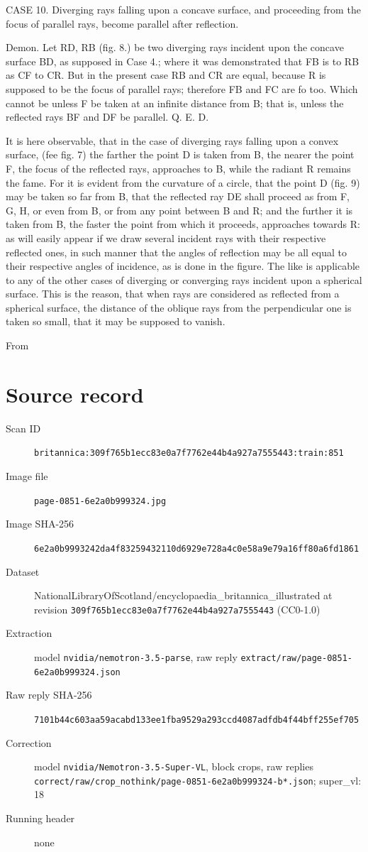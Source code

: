 \documentclass{article}
\begin{document}
CASE 10. Diverging rays falling upon a concave surface, and proceeding from the focus of parallel rays, become parallel after reflection.

Demon. Let RD, RB (fig. 8.) be two diverging rays incident upon the concave surface BD, as supposed in Case 4.; where it was demonstrated that FB is to RB as CF to CR. But in the present case RB and CR are equal, because R is supposed to be the focus of parallel rays; therefore FB and FC are fo too. Which cannot be unless F be taken at an infinite distance from B; that is, unless the reflected rays BF and DF be parallel. Q. E. D.

It is here observable, that in the case of diverging rays falling upon a convex surface, (fee fig. 7) the farther the point D is taken from B, the nearer the point F, the focus of the reflected rays, approaches to B, while the radiant R remains the fame. For it is evident from the curvature of a circle, that the point D (fig. 9) may be taken so far from B, that the reflected ray DE shall proceed as from F, G, H, or even from B, or from any point between B and R; and the further it is taken from B, the faster the point from which it proceeds, approaches towards R: as will easily appear if we draw several incident rays with their respective reflected ones, in such manner that the angles of reflection may be all equal to their respective angles of incidence, as is done in the figure. The like is applicable to any of the other cases of diverging or converging rays incident upon a spherical surface. This is the reason, that when rays are considered as reflected from a spherical surface, the distance of the oblique rays from the perpendicular one is taken so small, that it may be supposed to vanish.

From


\section*{Source record}
\begin{description}
\item[Scan ID] \texttt{britannica:309f765b1ecc83e0a7f7762e44b4a927a7555443:train:851}
\item[Image file] \texttt{page-0851-6e2a0b999324.jpg}
\item[Image SHA-256] \texttt{6e2a0b9993242da4f83259432110d6929e728a4c0e58a9e79a16ff80a6fd1861}
\item[Dataset] NationalLibraryOfScotland/encyclopaedia\_britannica\_illustrated at revision \texttt{309f765b1ecc83e0a7f7762e44b4a927a7555443} (CC0-1.0)
\item[Extraction] model \texttt{nvidia/nemotron-3.5-parse}, raw reply \texttt{extract/raw/page-0851-6e2a0b999324.json}
\item[Raw reply SHA-256] \texttt{7101b44c603aa59acabd133ee1fba9529a293ccd4087adfdb4f44bff255ef705}
\item[Correction] model \texttt{nvidia/Nemotron-3.5-Super-VL}, block crops, raw replies \texttt{correct/raw/crop\_nothink/page-0851-6e2a0b999324-b*.json}; super\_vl: 18
\item[Running header] none
\end{description}
\end{document}
